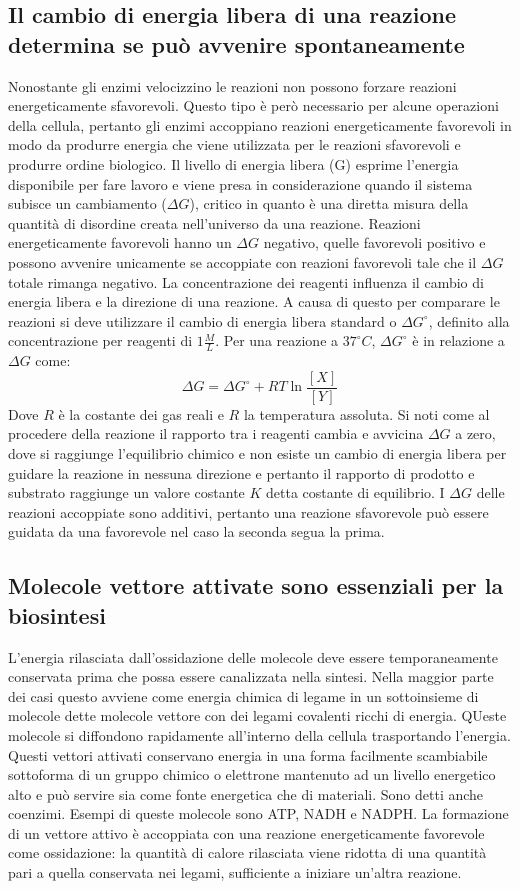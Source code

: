 \subsection{Il cambio di energia libera di una reazione determina se pu\`o avvenire spontaneamente}
Nonostante gli enzimi velocizzino le reazioni non possono forzare reazioni energeticamente sfavorevoli. Questo tipo \`e per\`o necessario per alcune operazioni della cellula, pertanto
gli enzimi accoppiano reazioni energeticamente favorevoli in modo da produrre energia che viene utilizzata per le reazioni sfavorevoli e produrre ordine biologico. Il livello di energia
libera (G) esprime l'energia disponibile per fare lavoro e viene presa in considerazione quando il sistema subisce un cambiamento ($\Delta G$), critico in quanto \`e una diretta misura
della quantit\`a di disordine creata nell'universo da una reazione. Reazioni energeticamente favorevoli hanno un $\Delta G$ negativo, quelle favorevoli positivo e possono avvenire 
unicamente se accoppiate con reazioni favorevoli tale che il $\Delta G$ totale rimanga negativo. La concentrazione dei reagenti influenza il cambio di energia libera e la direzione di 
una reazione. A causa di questo per comparare le reazioni si deve utilizzare il cambio di energia libera standard o $\Delta G^{\circ}$, definito alla concentrazione per reagenti di
$1\frac{M}{L}$. Per una reazione  a $37^\circ C$, $\Delta G^\circ$ \`e in relazione a $\Delta G$ come:
$$\Delta G = \Delta G^\circ + RT\ln\dfrac{[X]}{[Y]}$$
Dove $R$ \`e la costante dei gas reali e $R$ la temperatura assoluta. Si noti come al procedere della reazione il rapporto tra i reagenti cambia e avvicina $\Delta G$ a zero, dove si 
raggiunge l'equilibrio chimico e non esiste un cambio di energia libera per guidare la reazione in nessuna direzione e pertanto il rapporto di prodotto e substrato raggiunge un valore
costante $K$ detta costante di equilibrio. I $\Delta G$ delle reazioni accoppiate sono additivi, pertanto una reazione sfavorevole pu\`o essere guidata da una favorevole nel caso la 
seconda segua la prima. 
\subsection{Molecole vettore attivate sono essenziali per la biosintesi}
L'energia rilasciata dall'ossidazione delle molecole deve essere temporaneamente conservata prima che possa essere canalizzata nella sintesi. Nella maggior parte dei casi questo avviene
come energia chimica di legame in un sottoinsieme di molecole dette molecole vettore con dei legami covalenti ricchi di energia. QUeste molecole si diffondono rapidamente all'interno 
della cellula trasportando l'energia. Questi vettori attivati conservano energia in una forma facilmente scambiabile sottoforma di un gruppo chimico o elettrone mantenuto ad un livello
energetico alto e pu\`o servire sia come fonte energetica che di materiali. Sono detti anche coenzimi. Esempi di queste molecole sono ATP, NADH e NADPH. La formazione di un vettore 
attivo \`e accoppiata con una reazione energeticamente favorevole come ossidazione: la quantit\`a di calore rilasciata viene ridotta di una quantit\`a pari a quella conservata nei 
legami, sufficiente a iniziare un'altra reazione.

